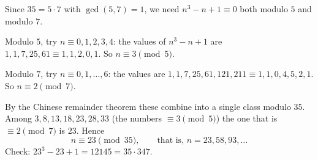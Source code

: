 Since $35=5\cdot7$ with $\gcd(5,7)=1$, we need $n^3-n+1\equiv0$ both modulo $5$ and modulo $7$.

Modulo $5$, try $n\equiv0,1,2,3,4$: the values of $n^3-n+1$ are $1,1,7,25,61\equiv1,1,2,0,1$. So $n\equiv3\pmod 5$.

Modulo $7$, try $n\equiv0,1,\dots,6$: the values are $1,1,7,25,61,121,211\equiv1,1,0,4,5,2,1$. So $n\equiv2\pmod 7$.

By the Chinese remainder theorem these combine into a single class modulo $35$. Among $3,8,13,18,23,28,33$ (the numbers $\equiv3\pmod5$) the one that is $\equiv2\pmod7$ is $23$. Hence
\[
\boxed{n\equiv23\pmod{35}},\qquad\text{that is, } n=23,58,93,\dots
\]
Check: $23^3-23+1=12145=35\cdot347$.
